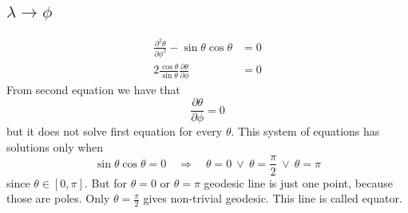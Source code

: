 \subsection*{$\lambda \rightarrow \phi$}

\begin{subequations}
    \begin{align}
        \frac{\partial^2 \theta}{\partial \phi^2} -
        \sin\theta\cos\theta                  & = 0 \\
        2\frac{\cos\theta}{\sin\theta}
        \frac{\partial \theta}{\partial \phi} & = 0
    \end{align}
\end{subequations}
%
From second equation we have that
%
\begin{equation}
    \frac{\partial \theta}{\partial \phi} = 0
\end{equation}
% 
but it does not solve first equation for every $\theta$. This system of
equations has solutions only when
%
\begin{equation}
    \sin\theta\cos\theta = 0
    \quad \Rightarrow \quad
    \theta = 0 ~\vee~ \theta = \frac{\pi}{2} ~\vee~ \theta = \pi
\end{equation}
%
since $\theta \in \left[0,\pi\right]$. But for $\theta = 0$ or $\theta = \pi$
geodesic line is just one point, because those are poles. Only $\theta =
    \frac{\pi}{2}$ gives non-trivial geodesic. This line is called equator.


